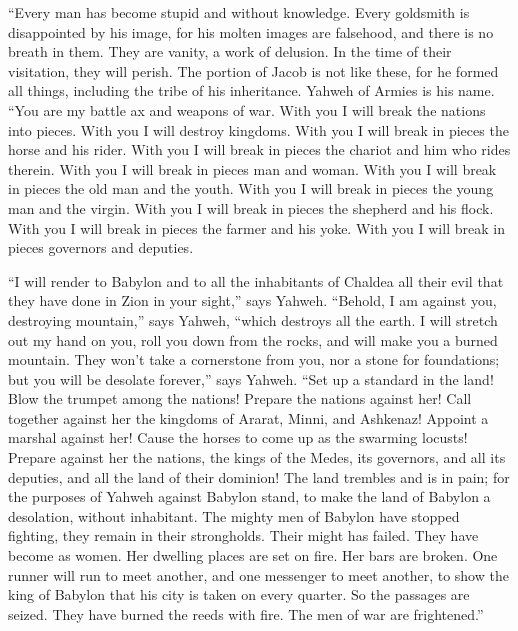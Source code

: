  ``Every man has become stupid and without knowledge. Every
goldsmith is disappointed by his image, for his molten images are
falsehood, and there is no breath in them.  They are
vanity, a work of delusion. In the time of their visitation, they will
perish.  The portion of Jacob is not like these, for he
formed all things, including the tribe of his inheritance. Yahweh of
Armies is his name.  ``You are my battle ax and weapons of
war. With you I will break the nations into pieces. With you I will
destroy kingdoms.  With you I will break in pieces the
horse and his rider.  With you I will break in pieces the
chariot and him who rides therein. With you I will break in pieces man
and woman. With you I will break in pieces the old man and the youth.
With you I will break in pieces the young man and the virgin.
 With you I will break in pieces the shepherd and his
flock. With you I will break in pieces the farmer and his yoke. With you
I will break in pieces governors and deputies.

 ``I will render to Babylon and to all the inhabitants of
Chaldea all their evil that they have done in Zion in your sight,'' says
Yahweh.  ``Behold, I am against you, destroying mountain,''
says Yahweh, ``which destroys all the earth. I will stretch out my hand
on you, roll you down from the rocks, and will make you a burned
mountain.  They won't take a cornerstone from you, nor a
stone for foundations; but you will be desolate forever,'' says Yahweh.
 ``Set up a standard in the land! Blow the trumpet among
the nations! Prepare the nations against her! Call together against her
the kingdoms of Ararat, Minni, and Ashkenaz! Appoint a marshal against
her! Cause the horses to come up as the swarming locusts! 
Prepare against her the nations, the kings of the Medes, its governors,
and all its deputies, and all the land of their dominion! 
The land trembles and is in pain; for the purposes of Yahweh against
Babylon stand, to make the land of Babylon a desolation, without
inhabitant.  The mighty men of Babylon have stopped
fighting, they remain in their strongholds. Their might has failed. They
have become as women. Her dwelling places are set on fire. Her bars are
broken.  One runner will run to meet another, and one
messenger to meet another, to show the king of Babylon that his city is
taken on every quarter.  So the passages are seized. They
have burned the reeds with fire. The men of war are frightened.''

